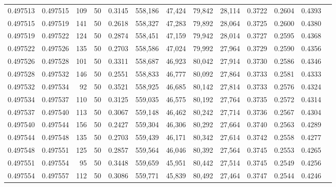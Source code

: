 \begin{tabular}{rrrrrrrrrrrrr}
0.497513 & 0.497515 &   109 &  50 &                                     0.3145 & 558,186 &  47,424 &  79,842 &  28,114 & 0.3722 & 0.2604 & 0.4393 \\
0.497515 & 0.497519 &   141 &  50 &                                     0.2618 & 558,327 &  47,283 &  79,892 &  28,064 & 0.3725 & 0.2600 & 0.4380 \\
0.497519 & 0.497522 &   124 &  50 &                                     0.2874 & 558,451 &  47,159 &  79,942 &  28,014 & 0.3727 & 0.2595 & 0.4368 \\
0.497522 & 0.497526 &   135 &  50 &                                     0.2703 & 558,586 &  47,024 &  79,992 &  27,964 & 0.3729 & 0.2590 & 0.4356 \\
0.497526 & 0.497528 &   101 &  50 &                                     0.3311 & 558,687 &  46,923 &  80,042 &  27,914 & 0.3730 & 0.2586 & 0.4346 \\
0.497528 & 0.497532 &   146 &  50 &                                     0.2551 & 558,833 &  46,777 &  80,092 &  27,864 & 0.3733 & 0.2581 & 0.4333 \\
0.497532 & 0.497534 &    92 &  50 &                                     0.3521 & 558,925 &  46,685 &  80,142 &  27,814 & 0.3733 & 0.2576 & 0.4324 \\
0.497534 & 0.497537 &   110 &  50 &                                     0.3125 & 559,035 &  46,575 &  80,192 &  27,764 & 0.3735 & 0.2572 & 0.4314 \\
0.497537 & 0.497540 &   113 &  50 &                                     0.3067 & 559,148 &  46,462 &  80,242 &  27,714 & 0.3736 & 0.2567 & 0.4304 \\
0.497540 & 0.497544 &   156 &  50 &                                     0.2427 & 559,304 &  46,306 &  80,292 &  27,664 & 0.3740 & 0.2563 & 0.4289 \\
0.497544 & 0.497548 &   135 &  50 &                                     0.2703 & 559,439 &  46,171 &  80,342 &  27,614 & 0.3742 & 0.2558 & 0.4277 \\
0.497548 & 0.497551 &   125 &  50 &                                     0.2857 & 559,564 &  46,046 &  80,392 &  27,564 & 0.3745 & 0.2553 & 0.4265 \\
0.497551 & 0.497554 &    95 &  50 &                                     0.3448 & 559,659 &  45,951 &  80,442 &  27,514 & 0.3745 & 0.2549 & 0.4256 \\
0.497554 & 0.497557 &   112 &  50 &                                     0.3086 & 559,771 &  45,839 &  80,492 &  27,464 & 0.3747 & 0.2544 & 0.4246 \\

\end{tabular}
